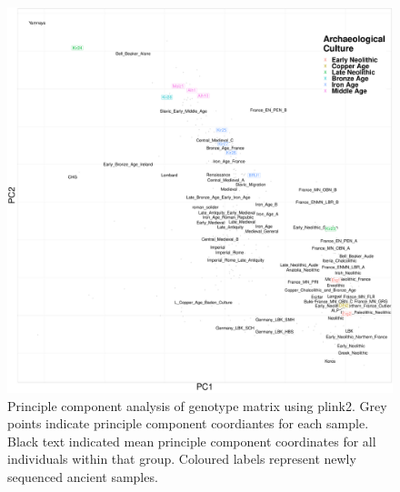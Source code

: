\begin{figure}[htp]
    \centering
    \includegraphics[width=1.0\textwidth]{../images/appendix/plink_withHG_PCA.pdf}
    \caption{Principle component analysis of genotype matrix using plink2. Grey points indicate principle component coordiantes for each sample. Black text indicated mean principle component coordinates for all individuals within that group. Coloured labels represent newly sequenced ancient samples. }
    \label{fig:plink_PCA_HG}
\end{figure}


